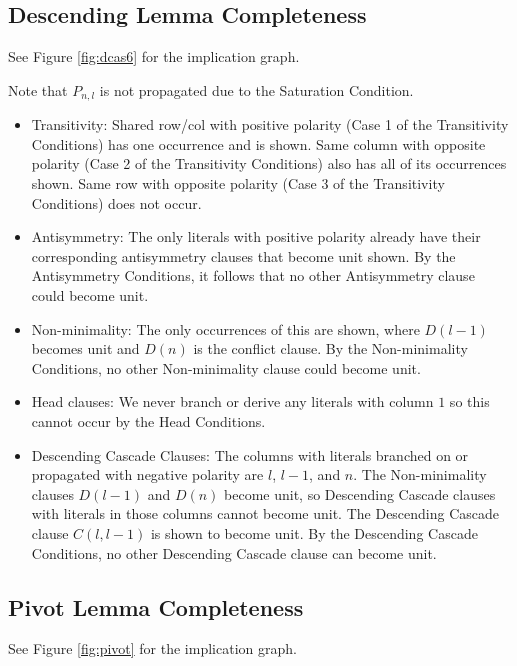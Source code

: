 \documentclass[a4paper,UKenglish,cleveref, autoref, thm-restate]{lipics-v2021}
\begin{document}
\subsection{Descending Lemma Completeness}
See Figure \ref{fig:dcas6} for the implication graph.

Note that $P_{n, l}$ is not propagated due to the Saturation Condition. 
\begin{itemize}
    \item Transitivity: Shared row/col with positive polarity (Case 1 of the Transitivity Conditions) has one occurrence and is shown. Same column with opposite polarity (Case 2 of the Transitivity Conditions) also has all of its occurrences shown. Same row with opposite polarity (Case 3 of the Transitivity Conditions) does not occur. 
    \item Antisymmetry: The only literals with positive polarity already have their corresponding antisymmetry clauses that become unit shown. By the Antisymmetry Conditions, it follows that no other Antisymmetry clause could become unit. 
    \item Non-minimality: The only occurrences of this are shown, where $D(l - 1)$ becomes unit and $D(n)$ is the conflict clause. By the Non-minimality Conditions, no other Non-minimality clause could become unit. 
    \item Head clauses: We never branch or derive any literals with column $1$ so this cannot occur by the Head Conditions. 
    \item Descending Cascade Clauses: The columns with literals branched on or propagated with negative polarity are $l$, $l - 1$, and $n$. The Non-minimality clauses $D(l - 1)$ and $D(n)$ become unit, so Descending Cascade clauses with literals in those columns cannot become unit. The Descending Cascade clause $C(l, l - 1)$ is shown to become unit. By the Descending Cascade Conditions, no other Descending Cascade clause can become unit.
\end{itemize}

\subsection{Pivot Lemma Completeness}
See Figure \ref{fig:pivot} for the implication graph.
\end{document}
